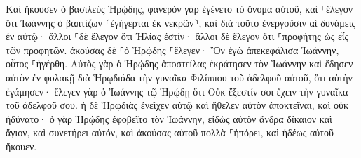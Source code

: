 \documentclass{openreader}
\begin{document}
Καὶ ἤκουσεν ὁ βασιλεὺς Ἡρῴδης, φανερὸν γὰρ ἐγένετο τὸ ὄνομα αὐτοῦ, καὶ ⸀ἔλεγον ὅτι Ἰωάννης ὁ βαπτίζων ⸂ἐγήγερται ἐκ νεκρῶν⸃, καὶ διὰ τοῦτο ἐνεργοῦσιν αἱ δυνάμεις ἐν αὐτῷ· 
ἄλλοι ⸀δὲ ἔλεγον ὅτι Ἠλίας ἐστίν· ἄλλοι δὲ ἔλεγον ὅτι ⸀προφήτης ὡς εἷς τῶν προφητῶν. 
ἀκούσας δὲ ⸀ὁ Ἡρῴδης ⸀ἔλεγεν· Ὃν ἐγὼ ἀπεκεφάλισα Ἰωάννην, οὗτος ⸀ἠγέρθη. 
Αὐτὸς γὰρ ὁ Ἡρῴδης ἀποστείλας ἐκράτησεν τὸν Ἰωάννην καὶ ἔδησεν αὐτὸν ἐν φυλακῇ διὰ Ἡρῳδιάδα τὴν γυναῖκα Φιλίππου τοῦ ἀδελφοῦ αὐτοῦ, ὅτι αὐτὴν ἐγάμησεν· 
ἔλεγεν γὰρ ὁ Ἰωάννης τῷ Ἡρῴδῃ ὅτι Οὐκ ἔξεστίν σοι ἔχειν τὴν γυναῖκα τοῦ ἀδελφοῦ σου. 
ἡ δὲ Ἡρῳδιὰς ἐνεῖχεν αὐτῷ καὶ ἤθελεν αὐτὸν ἀποκτεῖναι, καὶ οὐκ ἠδύνατο· 
ὁ γὰρ Ἡρῴδης ἐφοβεῖτο τὸν Ἰωάννην, εἰδὼς αὐτὸν ἄνδρα δίκαιον καὶ ἅγιον, καὶ συνετήρει αὐτόν, καὶ ἀκούσας αὐτοῦ πολλὰ ⸀ἠπόρει, καὶ ἡδέως αὐτοῦ ἤκουεν. 
\end{document}
